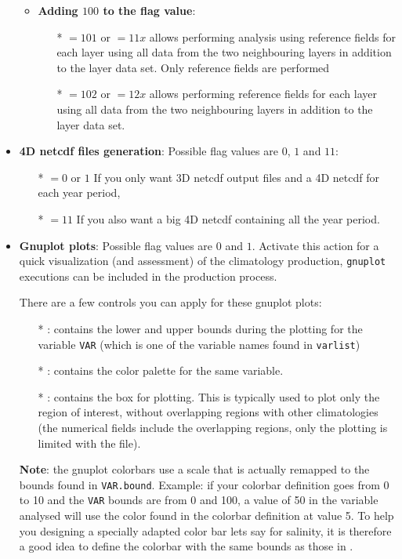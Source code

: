 \begin{itemize}
\begin{itemize}
\begin{itemize}
              \end{itemize}
  \item  {\bf Adding $100$ to the flag value}:
              \begin{itemize}
               \item[*] $=101$ or $=11x$ allows performing analysis using reference fields for each layer using all data from the two neighbouring layers in addition to the layer data set. Only reference fields are performed
               \item[*] $=102$ or $=12x$ allows performing reference fields for each layer using all data from the two neighbouring layers in addition to the layer data set.
              \end{itemize}
   \end{itemize}
\item {\bf 4D netcdf files generation}: Possible flag values are $0$, $1$ and $11$:
                \begin{itemize}
                \item[*] $=0$ or $1$ If you only want 3D netcdf output files and a 4D netcdf for each year period,
                \item[*] $=11$ If you also want a big 4D netcdf containing all the year period.
                \end{itemize}
\item {\bf Gnuplot plots}: Possible flag values are $0$ and $1$. Activate this action for a quick visualization (and assessment) of the climatology production, {\tt gnuplot} executions can be included in the production process.\par 
There are a few controls you can apply for these gnuplot plots:
\begin{itemize}
\item[*] : contains the lower and upper bounds during the plotting for the variable {\tt VAR} (which is one of the variable names found in {\tt varlist}) 
\item[*] : contains the color palette for the same variable.
\item[*] : contains the box for plotting. This is typically used to plot only the region of interest, without overlapping regions with other climatologies (the numerical fields include the overlapping regions, only the plotting is limited with the  file).
\end{itemize}
{\bf Note}: the gnuplot colorbars use a scale that is actually remapped to the bounds found in {\tt VAR.bound}. Example:
if your colorbar definition goes from 0 to 10 and the {\tt VAR} bounds are from 0 and 100, a value of 50 in the variable analysed will use the color found in the colorbar definition at value 5. To help you designing a specially adapted color bar lets say for salinity, it is therefore a good idea to define the colorbar with the same bounds as those in .


\end{itemize}
